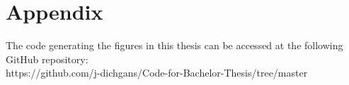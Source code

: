 \documentclass[%
thesis=student,%
coverpage=false,%
titlepage=false,%
headmarks=true, %
english,%
font=libertine, %
math=newpxtx, %
BCOR=5mm,%
coverBCOR=11mm%
]{tumbook}
\begin{document}
\appendix
\chapter{Appendix}
The code generating the figures in this thesis can be accessed at the following GitHub repository: \\
https://github.com/j-dichgans/Code-for-Bachelor-Thesis/tree/master


\backmatter{}
\listoffigures%
\listoftables%

\nocite{Alspach:2008,GaleShapley:1962} %
\printbibliography{} %
\end{document}
